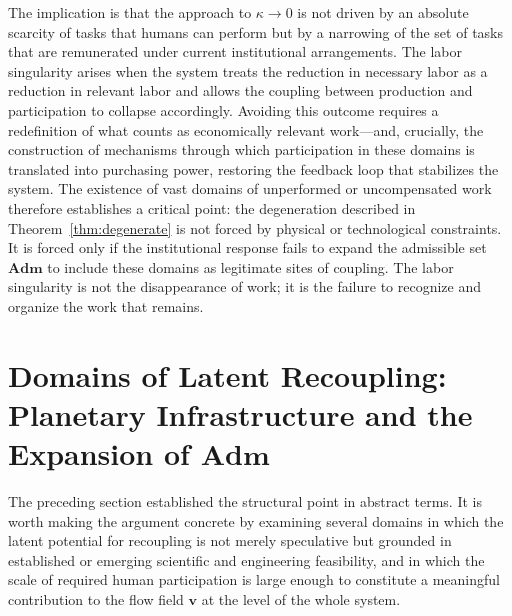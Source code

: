 \documentclass[11pt, a4paper]{article}
\theoremstyle{plain}
\theoremstyle{definition}
\newcommand{\vfield}{\mathbf{v}}
\newcommand{\Adm}{\mathbf{Adm}}
\newcommand{\coupling}{\kappa}
\begin{document}
The implication is that the approach to $\coupling \to 0$ is not driven by an
absolute scarcity of tasks that humans can perform but by a narrowing of the
set of tasks that are remunerated under current institutional arrangements.
The labor singularity arises when the system treats the reduction in necessary
labor as a reduction in relevant labor and allows the coupling between
production and participation to collapse accordingly. Avoiding this outcome
requires a redefinition of what counts as economically relevant work---and,
crucially, the construction of mechanisms through which participation in these
domains is translated into purchasing power, restoring the feedback loop that
stabilizes the system. The existence of vast domains of unperformed or
uncompensated work therefore establishes a critical point: the degeneration
described in Theorem~\ref{thm:degenerate} is not forced by physical or
technological constraints. It is forced only if the institutional response
fails to expand the admissible set $\Adm$ to include these domains as
legitimate sites of coupling. The labor singularity is not the disappearance
of work; it is the failure to recognize and organize the work that remains.

\section*{Domains of Latent Recoupling: Planetary Infrastructure and the
Expansion of $\Adm$}

The preceding section established the structural point in abstract terms.
It is worth making the argument concrete by examining several domains in which
the latent potential for recoupling is not merely speculative but grounded in
established or emerging scientific and engineering feasibility, and in which
the scale of required human participation is large enough to constitute a
meaningful contribution to the flow field $\vfield$ at the level of the whole
system.
\end{document}
